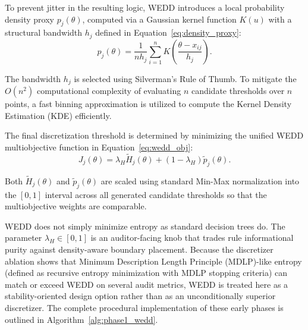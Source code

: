 \documentclass[make,article,submit,pdftex,moreauthors]{Definitions/mdpi}
\begin{document}
To prevent jitter in the resulting logic, WEDD introduces a local probability density proxy $p_j(\theta)$, computed via a Gaussian kernel function $K(u)$ with a structural bandwidth $h_j$ defined in Equation~\eqref{eq:density_proxy}:
\begin{equation}
 \label{eq:density_proxy}
 p_j(\theta) = \frac{1}{n h_j}\sum_{i=1}^{n}K\left(\frac{\theta-x_{ij}}{h_j}\right).
\end{equation}

The bandwidth $h_j$ is selected using Silverman's Rule of Thumb. To mitigate the $O(n^2)$ computational complexity of evaluating $n$ candidate thresholds over $n$ points, a fast binning approximation is utilized to compute the Kernel Density Estimation (KDE) efficiently.

The final discretization threshold is determined by minimizing the unified WEDD multiobjective function in Equation~\eqref{eq:wedd_obj}:
\begin{equation}
 \label{eq:wedd_obj}
 J_j(\theta) = \lambda_H\widetilde{H}_j(\theta) + (1-\lambda_H)\widetilde{p}_j(\theta).
\end{equation}

Both $\widetilde{H}_j(\theta)$ and $\widetilde{p}_j(\theta)$ are scaled using standard Min-Max normalization into the $[0,1]$ interval across all generated candidate thresholds so that the multiobjective weights are comparable.

WEDD does not simply minimize entropy as standard decision trees do. The parameter $\lambda_H \in [0,1]$ is an auditor-facing knob that trades rule informational purity against density-aware boundary placement. Because the discretizer ablation shows that Minimum Description Length Principle (MDLP)-like entropy (defined as recursive entropy minimization with MDLP stopping criteria) can match or exceed WEDD on several audit metrics, WEDD is treated here as a stability-oriented design option rather than as an unconditionally superior discretizer. The complete procedural implementation of these early phases is outlined in Algorithm~\ref{alg:phase1_wedd}.
\end{document}
